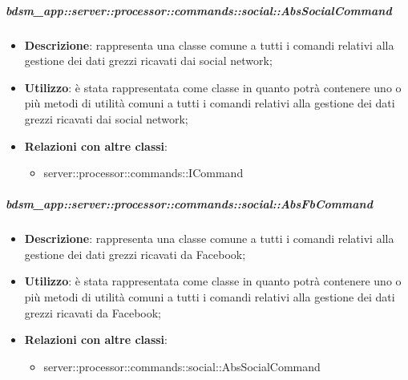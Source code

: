         \subparagraph{bdsm\_app::server::processor::commands::social::AbsSocialCommand} %
        \label{subp:bdsm_app_server_processor_commands_social_abssocialcommand}
        \begin{itemize}
          \item \textbf{Descrizione}: rappresenta una classe comune a tutti i comandi relativi alla gestione dei dati grezzi ricavati dai social network;
          \item \textbf{Utilizzo}: è stata rappresentata come classe in quanto potrà contenere uno o più metodi di utilità comuni a tutti i comandi relativi alla gestione dei dati grezzi ricavati dai social network;
          \item \textbf{Relazioni con altre classi}:
            \begin{itemize}
              \item server::processor::commands::ICommand
            \end{itemize}
        \end{itemize}


        \subparagraph{bdsm\_app::server::processor::commands::social::AbsFbCommand} %
        \label{subp:bdsm_app_server_processor_commands_social_absfbcommand}
        \begin{itemize}
          \item \textbf{Descrizione}: rappresenta una classe comune a tutti i comandi relativi alla gestione dei dati grezzi ricavati da Facebook;
          \item \textbf{Utilizzo}: è stata rappresentata come classe in quanto potrà contenere uno o più metodi di utilità comuni a tutti i comandi relativi alla gestione dei dati grezzi ricavati da Facebook;
          \item \textbf{Relazioni con altre classi}:
            \begin{itemize}
              \item server::processor::commands::social::AbsSocialCommand
            \end{itemize}
        \end{itemize}

